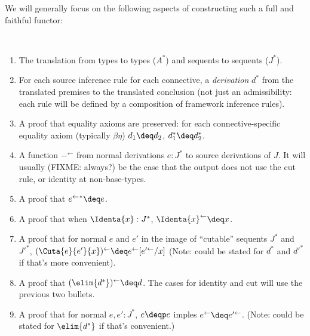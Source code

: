 \newcommand\backtrf[1]{\ensuremath{#1^{\leftarrow}}}
\newcommand\backtr[1]{\ensuremath{#1^{\Leftarrow}}}

We will generally focus on the following aspects of constructing such a
full and faithful functor:
\begin{definition} ~
\begin{enumerate}
\item The translation from types to types ($A^*$) and sequents to
  sequents ($J^*$).

\item For each source inference rule for each connective, a
  \emph{derivation} $d^*$ from the translated premises to the translated
  conclusion (not just an admissibility: each rule will be defined by a
  composition of framework inference rules).

\item A proof that equality axioms are preserved: for each
  connective-specific equality axiom (typically $\beta\eta$) $d_1 \deq
  d_2$, $d_1^* \deq d_2^*$.

\item A function \backtrf{-} from normal derivations $e : J^*$ to source
  derivations of $J$.  It will usually (FIXME: always?) be the case that
  the output does not use the cut rule, or identity at non-base-types.  

\item A proof that ${\backtrf{e}}^* \deq e$.  

\item A proof that when $\Identa{x} : J^*$, $\backtrf{\Identa{x}} \deq
  x$.

\item A proof that for normal $e$ and $e'$ in the image of ``cutable''
  sequents $J^*$ and $J'^*$, $\backtrf{(\Cuta{e}{e'}{x})} \deq
  \backtrf{e}[\backtrf{e'}/x]$ (Note: could be stated for $d^*$ and
  $d'^*$ if that's more convenient).  

\item A proof that $\backtrf{(\elim{d^*})} \deq d$.  The cases for
  identity and cut will use the previous two bullets.

\item A proof that for normal $e,e' : J^*$, $e \deqp e$ imples
  $\backtrf{e} \deq \backtrf{e'}$.  (Note: could be stated for
  $\elim{d^*}$ if that's convenient.)
\end{enumerate}
\end{definition}

